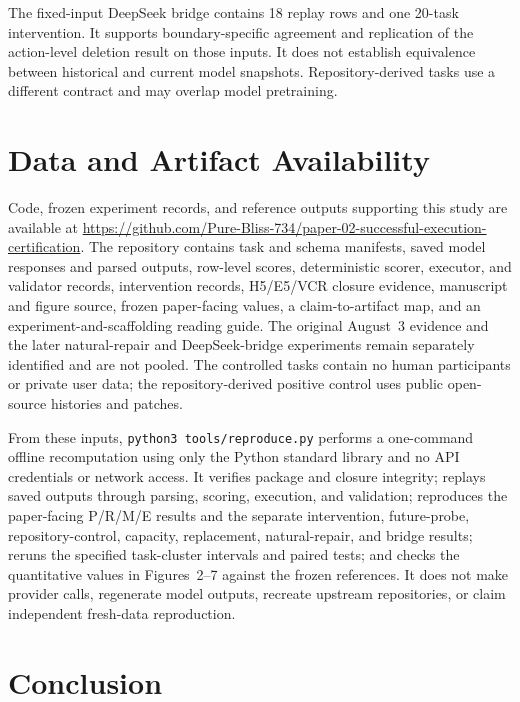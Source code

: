 \documentclass[11pt]{article}
\begin{document}
The fixed-input DeepSeek bridge contains 18 replay rows and one 20-task intervention. It supports boundary-specific agreement and replication of the action-level deletion result on those inputs. It does not establish equivalence between historical and current model snapshots. Repository-derived tasks use a different contract and may overlap model pretraining.

\section{Data and Artifact Availability}
\label{sec:data}
\enlargethispage{\baselineskip}

Code, frozen experiment records, and reference outputs supporting this study are available at {\small\url{https://github.com/Pure-Bliss-734/paper-02-successful-execution-certification}}. The repository contains task and schema manifests, saved model responses and parsed outputs, row-level scores, deterministic scorer, executor, and validator records, intervention records, H5/E5/VCR closure evidence, manuscript and figure source, frozen paper-facing values, a claim-to-artifact map, and an experiment-and-scaffolding reading guide. The original August~3 evidence and the later natural-repair and DeepSeek-bridge experiments remain separately identified and are not pooled. The controlled tasks contain no human participants or private user data; the repository-derived positive control uses public open-source histories and patches.

From these inputs, \texttt{python3 tools/reproduce.py} performs a one-command offline recomputation using only the Python standard library and no API credentials or network access. It verifies package and closure integrity; replays saved outputs through parsing, scoring, execution, and validation; reproduces the paper-facing P/R/M/E results and the separate intervention, future-probe, repository-control, capacity, replacement, natural-repair, and bridge results; reruns the specified task-cluster intervals and paired tests; and checks the quantitative values in Figures~2--7 against the frozen references. It does not make provider calls, regenerate model outputs, recreate upstream repositories, or claim independent fresh-data reproduction.

\section{Conclusion}
\label{sec:conclusion}
\end{document}
